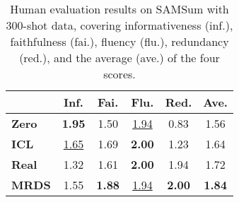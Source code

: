 
\begin{table}[th!]
\caption{Human evaluation results on SAMSum with 300-shot data, covering informativeness (inf.), faithfulness (fai.), fluency (flu.), redundancy (red.), and the average (ave.) of the four scores.}
\label{tab:sub}
\centering
\begin{tabular}{lcccc|c}
\toprule
     & \textbf{Inf.} & \textbf{Fai.} & \textbf{Flu.} & \textbf{Red.} & \textbf{Ave.} \\
\midrule
\textbf{Zero}          & \textbf{1.95} & 1.50 & \underline{1.94} & 0.83 & 1.56 \\
\textbf{ICL}           & \underline{1.65} & 1.69 & \textbf{2.00} & 1.23 & 1.64 \\
\textbf{Real}          & 1.32 & 1.61 & \textbf{2.00} & 1.94 & 1.72 \\
\textbf{MRDS}           & 1.55 & \textbf{1.88} & \underline{1.94} & \textbf{2.00} & \textbf{1.84} \\
\bottomrule
\end{tabular}
\end{table}

